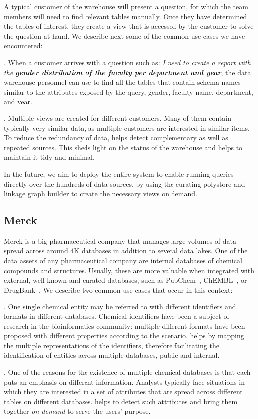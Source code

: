 A typical customer of the warehouse will present a question, for which the team members will need to find relevant tables manually. Once they have determined the tables of interest, they create a view that is accessed by the customer to solve the question at hand. We describe next some of the common use cases we have encountered:

. When a customer arrives with a question such as: \emph{I need to create a report with the \textbf{gender distribution of the faculty per department and year}}, the data warehouse personnel can use \dcv to find all the tables that contain schema names similar to the attributes exposed by the query, \eg gender, faculty name, department, and year.

. Multiple views are created for different customers. Many of them contain typically very similar data, as multiple customers are interested in similar items. To reduce the redundancy of data, \dcv helps  detect complementary as well as repeated sources. This sheds light on the status of the warehouse and helps to maintain it tidy and minimal.

In the future, we aim to deploy the entire \dcv system to enable running queries directly over the hundreds of data sources, by using the curating polystore and linkage graph builder to create the necessary views on demand. 

\subsection{Merck}


Merck is a big pharmaceutical company that manages large volumes of data spread across around 4K databases in addition to several data lakes. 
One of the data assets of any pharmaceutical company are internal databases of chemical compounds and structures. Usually, these are more valuable when integrated with external, well-known and curated databases, such as PubChem~\cite{pubchem}, ChEMBL~\cite{ChEMBL}, or DrugBank~\cite{DrugBank}. We describe two common use cases that occur in this context:


. One single chemical entity may be referred to with different identifiers and formats in different databases. Chemical identifiers have been a subject of research in the bioinformatics community: multiple different formats have been proposed with different properties according to the scenario. \dcv helps by mapping the multiple representations of the identifiers, therefore facilitating the identification of entities across multiple databases, public and internal.



. One of the reasons for the existence of multiple chemical databases is that each puts an emphasis on different information. Analysts typically face situations in which they are interested in a set of attributes that are spread across different tables on different databases. \dcv helps to detect such attributes and bring them together \emph{on-demand}  to serve the users' purpose.

